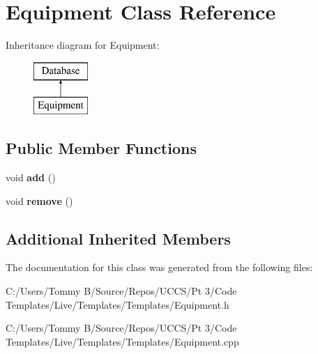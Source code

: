 \hypertarget{class_equipment}{}\section{Equipment Class Reference}
\label{class_equipment}
Inheritance diagram for Equipment\+:\begin{figure}[H]
\begin{center}
\leavevmode
\includegraphics[height=2.000000cm]{class_equipment}
\end{center}
\end{figure}
\subsection*{Public Member Functions}
\begin{DoxyCompactItemize}
\item 
\mbox{\label{class_equipment_a3b93df344783b00c53339a689b529e23}} 
void {\bfseries add} ()
\item 
\mbox{\label{class_equipment_ae387f95252f51394a117d261f215ffb0}} 
void {\bfseries remove} ()
\end{DoxyCompactItemize}
\subsection*{Additional Inherited Members}


The documentation for this class was generated from the following files\+:\begin{DoxyCompactItemize}
\item 
C\+:/\+Users/\+Tommy B/\+Source/\+Repos/\+U\+C\+C\+S/\+Pt 3/\+Code Templates/\+Live/\+Templates/\+Templates/Equipment.\+h\item 
C\+:/\+Users/\+Tommy B/\+Source/\+Repos/\+U\+C\+C\+S/\+Pt 3/\+Code Templates/\+Live/\+Templates/\+Templates/Equipment.\+cpp\end{DoxyCompactItemize}
